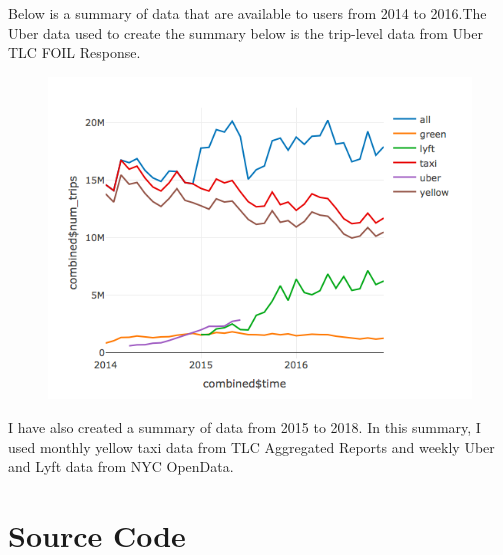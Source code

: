 \documentclass[12pt,twoside]{reedthesis}
\theoremstyle{definition}
\theoremstyle{definition}
\theoremstyle{definition}
\theoremstyle{remark}
\begin{document}
Below is a summary of data that are available to users from 2014 to
2016.The Uber data used to create the summary below is the trip-level
data from Uber TLC FOIL Response.
\begin{figure}
\centering
\includegraphics{figure/Num_trips_summary.png}
\caption{}
\end{figure}
I have also created a summary of data from 2015 to 2018. In this
summary, I used monthly yellow taxi data from TLC Aggregated Reports and
weekly Uber and Lyft data from NYC OpenData.

\section{Source Code}\label{source-code}
\end{document}
